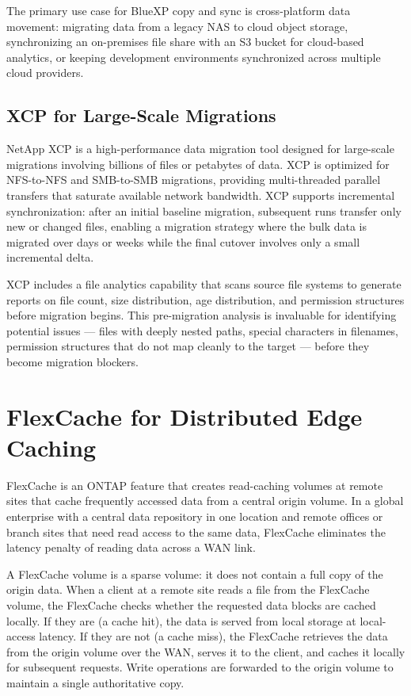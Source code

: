The primary use case for BlueXP copy and sync is cross-platform data movement: migrating data from a legacy NAS to cloud object storage, synchronizing an on-premises file share with an S3 bucket for cloud-based analytics, or keeping development environments synchronized across multiple cloud providers.

\subsection{XCP for Large-Scale Migrations}

NetApp XCP is a high-performance data migration tool designed for large-scale migrations involving billions of files or petabytes of data. XCP is optimized for NFS-to-NFS and SMB-to-SMB migrations, providing multi-threaded parallel transfers that saturate available network bandwidth. XCP supports incremental synchronization: after an initial baseline migration, subsequent runs transfer only new or changed files, enabling a migration strategy where the bulk data is migrated over days or weeks while the final cutover involves only a small incremental delta.

XCP includes a file analytics capability that scans source file systems to generate reports on file count, size distribution, age distribution, and permission structures before migration begins. This pre-migration analysis is invaluable for identifying potential issues --- files with deeply nested paths, special characters in filenames, permission structures that do not map cleanly to the target --- before they become migration blockers.

\section{FlexCache for Distributed Edge Caching}

FlexCache is an ONTAP feature that creates read-caching volumes at remote sites that cache frequently accessed data from a central origin volume. In a global enterprise with a central data repository in one location and remote offices or branch sites that need read access to the same data, FlexCache eliminates the latency penalty of reading data across a WAN link.

A FlexCache volume is a sparse volume: it does not contain a full copy of the origin data. When a client at a remote site reads a file from the FlexCache volume, the FlexCache checks whether the requested data blocks are cached locally. If they are (a cache hit), the data is served from local storage at local-access latency. If they are not (a cache miss), the FlexCache retrieves the data from the origin volume over the WAN, serves it to the client, and caches it locally for subsequent requests. Write operations are forwarded to the origin volume to maintain a single authoritative copy.

